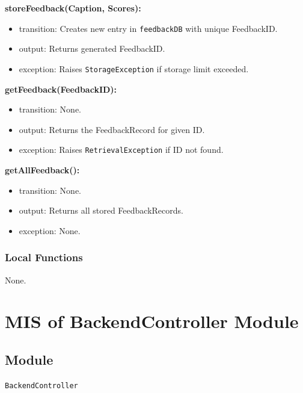 \documentclass[12pt, titlepage]{article}
\begin{document}
\noindent \textbf{storeFeedback(Caption, Scores):}
\begin{itemize}
  \item transition: Creates new entry in \texttt{feedbackDB} with unique FeedbackID.
  \item output: Returns generated FeedbackID.
  \item exception: Raises \texttt{StorageException} if storage limit exceeded.
\end{itemize}

\noindent \textbf{getFeedback(FeedbackID):}
\begin{itemize}
  \item transition: None.
  \item output: Returns the FeedbackRecord for given ID.
  \item exception: Raises \texttt{RetrievalException} if ID not found.
\end{itemize}

\noindent \textbf{getAllFeedback():}
\begin{itemize}
  \item transition: None.
  \item output: Returns all stored FeedbackRecords.
  \item exception: None.
\end{itemize}

\subsubsection{Local Functions}
None.
\section{MIS of BackendController Module} \label{Module}

\subsection{Module}

\texttt{BackendController}
\end{document}
